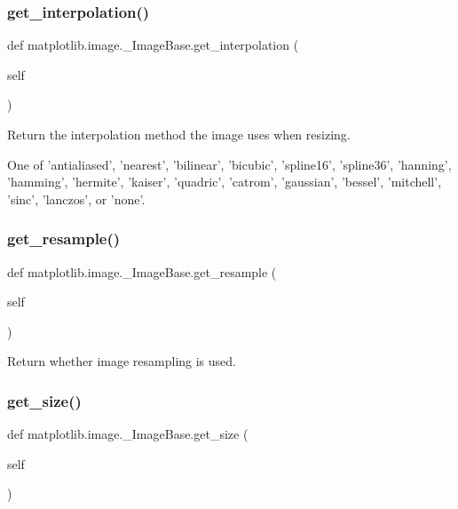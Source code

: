 \subsubsection{\texorpdfstring{get\+\_\+interpolation()}{get\_interpolation()}}
{\footnotesize\ttfamily def matplotlib.\+image.\+\_\+\+Image\+Base.\+get\+\_\+interpolation (\begin{DoxyParamCaption}\item[{}]{self }\end{DoxyParamCaption})}

\begin{DoxyVerb}Return the interpolation method the image uses when resizing.

One of 'antialiased', 'nearest', 'bilinear', 'bicubic', 'spline16',
'spline36', 'hanning', 'hamming', 'hermite', 'kaiser', 'quadric',
'catrom', 'gaussian', 'bessel', 'mitchell', 'sinc', 'lanczos',
or 'none'.
\end{DoxyVerb}
 \mbox{\label{classmatplotlib_1_1image_1_1__ImageBase_ada4c02e73f55a8258134014db4ef2af0}} 
\subsubsection{\texorpdfstring{get\+\_\+resample()}{get\_resample()}}
{\footnotesize\ttfamily def matplotlib.\+image.\+\_\+\+Image\+Base.\+get\+\_\+resample (\begin{DoxyParamCaption}\item[{}]{self }\end{DoxyParamCaption})}

\begin{DoxyVerb}Return whether image resampling is used.\end{DoxyVerb}
 \mbox{\label{classmatplotlib_1_1image_1_1__ImageBase_acc571a855419ea9bc9c83574a2f7dbed}} 
\subsubsection{\texorpdfstring{get\+\_\+size()}{get\_size()}}
{\footnotesize\ttfamily def matplotlib.\+image.\+\_\+\+Image\+Base.\+get\+\_\+size (\begin{DoxyParamCaption}\item[{}]{self }\end{DoxyParamCaption})}

